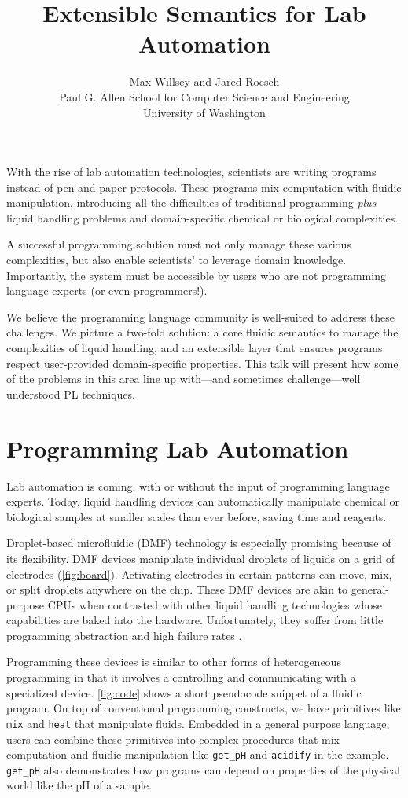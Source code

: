 \documentclass[
  10pt,
  a4paper,
  twocolumn,
]{article}
\title{Extensible Semantics for Lab Automation}
\author{Max Willsey and Jared Roesch
\\ \small Paul G. Allen School for Computer Science and Engineering
\\ \small University of Washington}
\date{}
\begin{document}
\maketitle

With the rise of lab automation technologies, scientists are writing programs instead
of pen-and-paper protocols.
These programs mix computation with fluidic manipulation,
introducing all the difficulties of traditional programming
\emph{plus} liquid handling problems and domain-specific chemical or biological complexities.

A successful programming solution must not only manage these various complexities,
but also enable scientists' to leverage domain knowledge.
Importantly, the system must be accessible by users who are not programming language experts (or even programmers!).

We believe the programming language community is well-suited
to address these challenges.
We picture a two-fold solution:
a core fluidic semantics to manage the complexities of liquid handling,
and an extensible layer that ensures programs respect user-provided domain-specific properties.
This talk will present how some of
the problems in this area line up with---and sometimes challenge---well understood PL techniques.

\section*{Programming Lab Automation}

Lab automation is coming, with or without the input of programming language experts.
Today, liquid handling devices can automatically manipulate chemical or biological samples
at smaller scales than ever before, saving time and reagents.

Droplet-based microfluidic (DMF) technology is especially promising because of its flexibility.
DMF devices manipulate individual droplets of liquids on a grid of electrodes (\autoref{fig:board}).
Activating electrodes in certain patterns can move, mix, or split droplets anywhere on the chip.
These DMF devices are akin to general-purpose CPUs when contrasted with other liquid handling
technologies whose capabilities are baked into the hardware.
Unfortunately, they suffer from little programming abstraction and high failure rates \cite{dmf-review}.

Programming these devices is similar to other forms of heterogeneous programming in that
it involves a controlling and communicating with a specialized device.
\autoref{fig:code} shows a short pseudocode snippet of a fluidic program.
On top of conventional programming constructs, we have primitives like {\tt mix} and {\tt heat} that manipulate fluids.
Embedded in a general purpose language, users can combine these primitives into complex procedures that mix computation and fluidic manipulation like {\tt get\_pH} and {\tt acidify} in the example.
{\tt get\_pH} also demonstrates how programs can depend on properties of the physical world like the pH of a sample.
\end{document}
